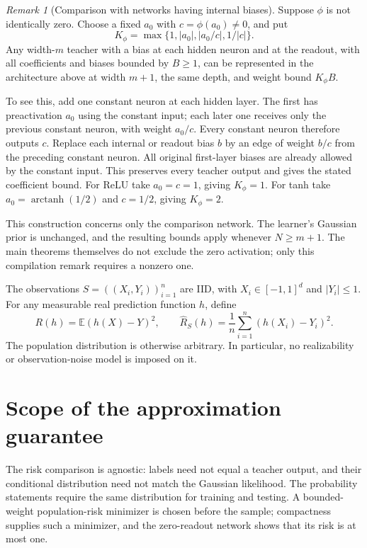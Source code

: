 \documentclass[11pt]{article}
\theoremstyle{definition}\newtheorem{definition}[theorem]{Definition}
\theoremstyle{remark}\newtheorem{remark}[theorem]{Remark}
\begin{document}
\begin{remark}[Comparison with networks having internal biases]
\label{rem:biased-teacher-compilation}
Suppose $\phi$ is not identically zero. Choose a fixed $a_0$ with
$c=\phi(a_0)\ne0$, and put
\[
 K_\phi=\max\{1,|a_0|,|a_0/c|,1/|c|\}.
\]
Any width-$m$ teacher with a bias at each hidden neuron and at the
readout, with all coefficients and biases bounded by $B\geq1$, can
be represented in the architecture above at width $m+1$, the same
depth, and weight bound $K_\phi B$.

To see this, add one constant neuron at each hidden layer. The first
has preactivation $a_0$ using the constant input; each later one
receives only the previous constant neuron, with weight $a_0/c$.
Every constant neuron therefore outputs $c$. Replace each internal
or readout bias $b$ by an edge of weight $b/c$ from the preceding
constant neuron. All original first-layer biases are already allowed
by the constant input. This preserves every teacher output and gives
the stated coefficient bound. For ReLU take $a_0=c=1$, giving
$K_\phi=1$. For tanh take $a_0=\operatorname{arctanh}(1/2)$ and
$c=1/2$, giving $K_\phi=2$.

This construction concerns only the comparison network. The learner's
Gaussian prior is unchanged, and the resulting bounds apply whenever
$N\geq m+1$. The main theorems themselves do not exclude the zero
activation; only this compilation remark requires a nonzero one.
\end{remark}

The observations $S=((X_i,Y_i))_{i=1}^n$ are IID, with
$X_i\in[-1,1]^d$ and $|Y_i|\leq1$. For any measurable real prediction
function $h$, define
\[
 R(h)=\mathbb E(h(X)-Y)^2,\qquad
 \widehat R_S(h)=\frac1n\sum_{i=1}^n(h(X_i)-Y_i)^2.
\]
The population distribution is otherwise arbitrary. In particular,
no realizability or observation-noise model is imposed on it.







\section{Scope of the approximation guarantee}
The risk comparison is agnostic: labels need not equal a teacher output,
and their conditional distribution need not match the Gaussian likelihood.
The probability statements require the same distribution for training and
testing. A bounded-weight population-risk minimizer is chosen before the
sample; compactness supplies such a minimizer, and the zero-readout network
shows that its risk is at most one.
\end{document}
